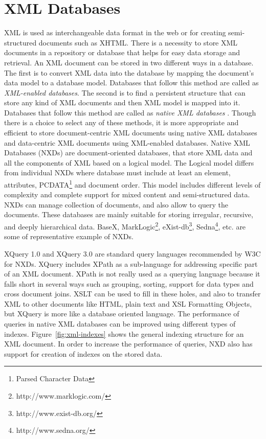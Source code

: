 \section{XML Databases}

  XML is used as interchangeable data format in the web or for creating semi-structured documents such as XHTML. There is a necessity to store XML documents in a repository or database that helps for easy data storage and retrieval. An XML document can be stored in two different ways in a database. The first is to convert XML data into the database by mapping the document's data model to a database model. Databases that follow this method are called as \textit{XML-enabled databases}. The second is to find a persistent structure that can store any kind of XML documents and then XML model is mapped into it. Databases that follow this method are called as \textit{native XML databases} \cite{pavlovic2007native}. Though there is a choice to select any of these methods, it is more appropriate and efficient to store document-centric XML documents using native XML databases and data-centric  XML documents using XML-enabled databases. Native XML Databases (NXDs) are document-oriented databases, that store XML data and all the components of XML based on a logical model. The Logical model differs from individual NXDs where database must include at least an element, attributes, PCDATA\footnote{Parsed Character Data} and document order. This model includes different levels of complexity and complete support for mixed content and semi-structured data. NXDs can manage collection of documents, and also allow to query the documents. These databases are mainly suitable for storing irregular, recursive, and deeply hierarchical data.  BaseX, MarkLogic\footnote{http://www.marklogic.com/}, eXist-db\footnote{http://www.exist-db.org/}, Sedna\footnote{http://www.sedna.org/}, etc. are some of representative example of NXDs. 
  \par XQuery 1.0 and XQuery 3.0 are standard query languages recommended by W3C for NXDs. XQuery includes XPath as a sub-language for addressing specific part of an XML document. XPath is not really used as a querying language because it falls short in several ways such as grouping, sorting, support for data types and cross document joins. XSLT can be used to fill in these holes, and also to transfer XML to other documents like HTML, plain text and XSL Formatting Objects, but XQuery is more like a database oriented language.  The performance of queries in native XML databases can be improved using different types of indexes. Figure~\ref{fig:xml-indexes} shows the general indexing structure for an XML document. 
  In order to increase the performance of queries, NXD also has support for creation of indexes on the stored data\cite{pavlovic2007native}.
